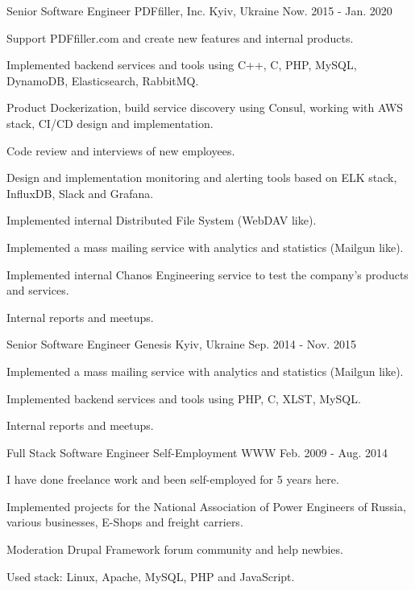 \begin{cventries}
  \cventry
    {Senior Software Engineer}
    {PDFfiller, Inc.}
    {Kyiv, Ukraine}
    {Now. 2015 - Jan. 2020}
    {
      \begin{cvitems}
        \item {Support PDFfiller.com and create new features and internal products.}
        \item {Implemented backend services and tools using C++, C, PHP, MySQL, DynamoDB, Elasticsearch, RabbitMQ.}
        \item {Product Dockerization, build service discovery using Consul, working with AWS stack, CI/CD design and implementation.}
        \item {Code review and interviews of new employees. }
        \item {Design and implementation monitoring and alerting tools based on ELK stack, InfluxDB, Slack and Grafana.}
        \item {Implemented internal Distributed File System (WebDAV like).}
        \item {Implemented a mass mailing service with analytics and statistics (Mailgun like).}
        \item {Implemented internal Chanos Engineering service to test the company's products and services.}
        \item {Internal reports and meetups.}
      \end{cvitems}
    }

  \cventry
    {Senior Software Engineer}
    {Genesis}
    {Kyiv, Ukraine}
    {Sep. 2014 - Nov. 2015}
    {
      \begin{cvitems}
        \item {Implemented a mass mailing service with analytics and statistics (Mailgun like).}
        \item {Implemented backend services and tools using PHP, C, XLST, MySQL.}
        \item {Internal reports and meetups.}
      \end{cvitems}
    }

  \cventry
    {Full Stack Software Engineer}
    {Self-Employment}
    {WWW}
    {Feb. 2009 - Aug. 2014}
    {
      \begin{cvitems}
        \item {I have done freelance work and been self-employed for 5 years here.}
        \item {Implemented projects for the National Association of Power Engineers of Russia, various businesses, E-Shops and freight carriers.}
        \item {Moderation Drupal Framework forum community and help newbies.}
        \item {Used stack: Linux, Apache, MySQL, PHP and JavaScript.}
      \end{cvitems}
    }


\end{cventries}
